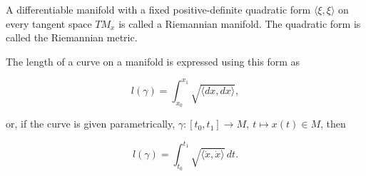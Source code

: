 A differentiable manifold with a fixed positive-definite quadratic form $\langle \xi, \xi \rangle$ on every tangent space $TM_x$ is called a Riemannian manifold. The quadratic form is called the Riemannian metric.

The length of a curve on a manifold is expressed using this form as

$$l(\gamma) = \int_{x_0}^{x_1} \sqrt{\langle dx, dx \rangle},$$

or, if the curve is given parametrically, $\gamma: [t_0, t_1] \to M,\ t \mapsto x(t) \in M$, then

$$l(\gamma) = \int_{t_0}^{t_1} \sqrt{\langle \dot{x}, \dot{x} \rangle}\, dt.$$
